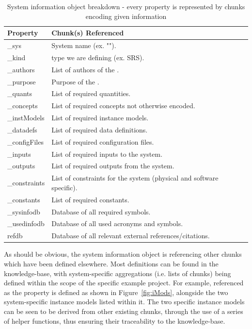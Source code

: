\begin{table}[]
\caption{System information object breakdown - every property is represented by 
chunks encoding given information}
\label{tab:siBreakdown}
\begin{tabular}{| P{.2\linewidth} | p{.8\linewidth}|}
\hline
 \textbf{Property} & \textbf{Chunk(s) Referenced}
\\ \hline
	\_sys & System name (ex. "\gb{}").
\\ \hline
	\_kind & \SF{} type we are defining (ex. SRS).
\\ \hline
	\_authors & List of authors of the \sf{}.
\\ \hline
	\_purpose & Purpose of the \sf{}.
\\ \hline
	\_quants & List of required quantities.
\\ \hline
	\_concepts & List of required concepts not otherwise encoded.
\\ \hline
	\_instModels & List of required instance models.
\\ \hline
	\_datadefs & List of required data definitions.
\\ \hline
	\_configFiles & List of required configuration files.
\\ \hline
	\_inputs & List of required inputs to the system.
\\ \hline
	\_outputs & List of required outputs from the system.
\\ \hline
	\_constraints & List of constraints for the system (physical and software 
	specific).
\\ \hline
	\_constants & List of required constants. 
\\ \hline
	\_sysinfodb & Database of all required symbols. 
\\ \hline
	\_usedinfodb & Database of all used acronyms and symbols. 
\\ \hline
	refdb & Database of all relevant external references/citations.
\\ \hline
\end{tabular}
\end{table}
 
As should be obvious, the system information object is referencing other chunks 
which have been defined elsewhere. Most definitions can be found in the 
knowledge-base, with system-specific aggregations (i.e. lists of chunks) being 
defined within the scope of the specific example project. For example, 
 referenced as the  property is defined 
as shown in Figure~\ref{fig:iMods}, alongside the two system-specific instance 
models listed within it. The two specific instance models can be seen to be 
derived from other existing chunks, through the use of a series of helper 
functions, thus ensuring their traceability to the knowledge-base.

